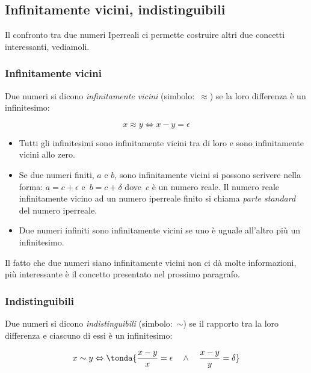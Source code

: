 \subsection{Infinitamente vicini, indistinguibili}
\label{subsec:insnum_infvicindist}

Il confronto tra due numeri Iperreali ci permette costruire altri due 
concetti 
interessanti, vediamoli. 

\subsubsection{Infinitamente vicini}
\label{subsec:insnum_infinitamentevicini}

\begin{definizione}
Due numeri si dicono \emph{infinitamente vicini} (simbolo:~$\approx$) se 
la loro differenza è un infinitesimo: 

\[x \approx y \Leftrightarrow x - y = \epsilon\]

\end{definizione}

\begin{itemize} [noitemsep]
 \item 
Tutti gli infinitesimi sono infinitamente vicini tra di loro e sono 
infinitamente vicini allo zero.
 \item
Se due numeri finiti, $a$ e $b$, sono infinitamente vicini si possono 
scrivere nella forma: $a = c + \epsilon$ e~$b = c + \delta$ dove~$c$ è un 
numero reale. Il numero reale infinitamente vicino ad un numero iperreale 
finito si chiama \emph{parte standard} del numero iperreale.
 \item
Due numeri infiniti sono infinitamente vicini se uno è uguale all'altro più 
un 
infinitesimo.
\end{itemize}

Il fatto che due numeri siano infinitamente vicini non ci dà molte 
informazioni, più interessante è il concetto presentato nel prossimo 
paragrafo.

\subsubsection{Indistinguibili}
\label{subsec:insnum_indistinguibili}

\begin{definizione}
Due numeri si dicono \emph{indistinguibili} (simbolo:~$\sim$) se il 
rapporto tra la loro differenza e ciascuno di essi è un infinitesimo:

\[x \sim y \Leftrightarrow 
\tonda{\frac{x-y}{x} = \epsilon \quad \wedge \quad \frac{x-y}{y} = \delta}
\]

\end{definizione}

